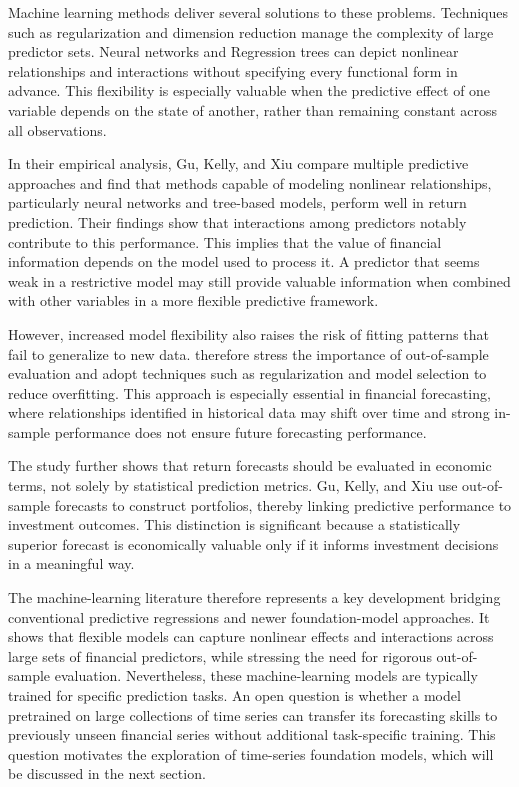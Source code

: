 \documentclass[12pt,a4paper,twoside,openany]{book}
\begin{document}
Machine learning methods deliver several solutions to these problems. Techniques such as regularization and dimension reduction manage the complexity of large predictor sets. Neural networks and Regression trees can depict nonlinear relationships and interactions without specifying every functional form in advance. This flexibility is especially valuable when the predictive effect of one variable depends on the state of another, rather than remaining constant across all observations.


In their empirical analysis, Gu, Kelly, and Xiu compare multiple predictive approaches and find that methods capable of modeling nonlinear relationships, particularly neural networks and tree-based models, perform well in return prediction. Their findings show that interactions among predictors notably contribute to this performance. This implies that the value of financial information depends on the model used to process it. A predictor that seems weak in a restrictive model may still provide valuable information when combined with other variables in a more flexible predictive framework.

However, increased model flexibility also raises the risk of fitting patterns that fail to generalize to new data. \cite{gu2020empirical} therefore stress the importance of out-of-sample evaluation and adopt techniques such as regularization and model selection to reduce overfitting. This approach is especially essential in financial forecasting, where relationships identified in historical data may shift over time and strong in-sample performance does not ensure future forecasting performance.

The study further shows that return forecasts should be evaluated in economic terms, not solely by statistical prediction metrics. Gu, Kelly, and Xiu use out-of-sample forecasts to construct portfolios, thereby linking predictive performance to investment outcomes. This distinction is significant because a statistically superior forecast is economically valuable only if it informs investment decisions in a meaningful way.

The machine-learning literature therefore represents a key development bridging conventional predictive regressions and newer foundation-model approaches. It shows that flexible models can capture nonlinear effects and interactions across large sets of financial predictors, while stressing the need for rigorous out-of-sample evaluation. Nevertheless, these machine-learning models are typically trained for specific prediction tasks. An open question is whether a model pretrained on large collections of time series can transfer its forecasting skills to previously unseen financial series without additional task-specific training. This question motivates the exploration of time-series foundation models, which will be discussed in the next section.
\end{document}
